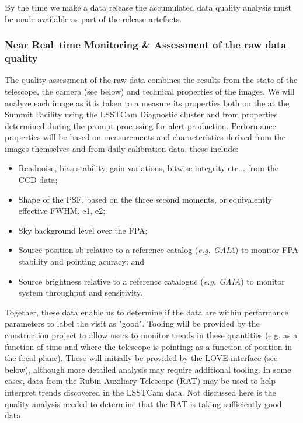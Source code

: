 By the time we make a data release the accumulated data quality analysis must be made available as part of the release artefacts.

\subsubsection{Near Real--time Monitoring \& Assessment of the raw data quality} 

The quality assessment of the raw data combines the results from the state of the telescope, the camera (see below) and technical properties of the images.  We will analyze each image as it is taken to a measure its properties both on the at the Summit Facility using the LSSTCam Diagnostic cluster and from properties determined during the prompt processing for alert production.  Performance properties will be based on measurements and characteristics derived from the images themselves and from daily calibration data, these include:

\begin{itemize}

	\item Readnoise, bias stability, gain variations, bitwise integrity etc...  from the CCD data;
	\item Shape of the PSF, based on the three second moments, or equivalently effective FWHM, e1, e2;
	\item Sky background level over the FPA;
	\item Source position	sb relative to a reference catalog ({\it e.g. GAIA}) to monitor FPA stability and pointing acuracy; and
	\item Source brightness relative to a reference catalogue ({\it e.g. GAIA}) to monitor system throughput and sensitivity.
	
\end{itemize}

Together, these data enable us to determine if the data are within performance parameters to label the visit as "good".   Tooling will be provided by the construction project to allow users to monitor trends in these quantities (e.g. as a function of time and where the telescope is pointing;  as a function of position in the focal plane).  These will initially be provided by the LOVE interface (see below), although more detailed analysis may require additional tooling.  In some cases, data from the Rubin Auxiliary Telescope (RAT) may be used to help interpret trends discovered in the LSSTCam data.  Not discussed here is the quality analysis needed to determine that the RAT is taking sufficiently good data.

